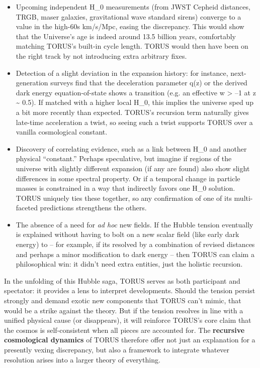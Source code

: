 \documentclass[
]{article}
\begin{document}
{\begin{itemize}
\item
  Upcoming independent
  H_{0}{} measurements
  (from JWST Cepheid distances, TRGB, maser galaxies, gravitational wave
  standard sirens) converge to a value in the high-60s km/s/Mpc, easing
  the discrepancy. This would show that the Universe's age is indeed
  around 13.5 billion years, comfortably matching TORUS's built-in cycle
  length. TORUS would then have been on the right track by not
  introducing extra arbitrary fixes.
\item
  Detection of a slight deviation in the expansion history: for
  instance, next-generation surveys find that the deceleration parameter
  q(z) or the derived dark energy equation-of-state shows a transition
  (e.g. an effective w \textgreater{} --1 at z \textasciitilde{} 0.5).
  If matched with a higher local
  H_{0}, this implies the
  universe sped up a bit more recently than expected. TORUS's recursion
  term naturally gives late-time acceleration a twist, so seeing such a
  twist supports TORUS over a vanilla cosmological constant.
\item
  Discovery of correlating evidence, such as a link between
  H_{0}{} and another
  physical ``constant.'' Perhaps speculative, but imagine if regions of
  the universe with slightly different expansion (if any are found) also
  show slight differences in some spectral property. Or if a temporal
  change in particle masses is constrained in a way that indirectly
  favors one H_{0}{}
  solution. TORUS uniquely ties these together, so any confirmation of
  one of its multi-faceted predictions strengthens the others.
\item
  The absence of a need for \emph{ad hoc} new fields. If the Hubble
  tension eventually is explained without having to bolt on a new scalar
  field (like early dark energy) to \LambdaCDM -- for example, if
  it\textquotesingle s resolved by a combination of revised distances
  and perhaps a minor modification to dark energy -- then TORUS can
  claim a philosophical win: it didn't need extra entities, just the
  holistic recursion.
\end{itemize}

In the unfolding of this Hubble saga, TORUS serves as both participant
and spectator: it provides a lens to interpret developments. Should the
tension persist strongly and demand exotic new components that TORUS
can't mimic, that would be a strike against the theory. But if the
tension resolves in line with a unified physical cause (or disappears),
it will reinforce TORUS's core claim that the cosmos is self-consistent
when all pieces are accounted for. The \textbf{recursive cosmological
dynamics} of TORUS therefore offer not just an explanation for a
presently vexing discrepancy, but also a framework to integrate whatever
resolution arises into a larger theory of everything.

}
\end{document}
